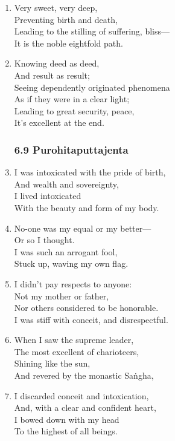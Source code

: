\documentclass[10pt, openany]{book}
\begin{document}
\begin{enumerate}
\item Very sweet, very deep,\\
Preventing birth and death,\\
Leading to the stilling of suffering, bliss—\\
It is the noble eightfold path.

\item Knowing deed as deed,\\
And result as result;\\
Seeing dependently originated phenomena\\
As if they were in a clear light;\\
Leading to great security, peace,\\
It’s excellent at the end.

\subsubsection*{6.9 Purohitaputtajenta}

\item I was intoxicated with the pride of birth,\\
And wealth and sovereignty,\\
I lived intoxicated\\
With the beauty and form of my body.

\item No-one was my equal or my better—\\
Or so I thought.\\
I was such an arrogant fool,\\
Stuck up, waving my own flag.

\item I didn’t pay respects to anyone:\\
Not my mother or father,\\
Nor others considered to be honorable.\\
I was stiff with conceit, and disrespectful.

\item When I saw the supreme leader,\\
The most excellent of charioteers,\\
Shining like the sun,\\
And revered by the monastic Saṅgha,

\item I discarded conceit and intoxication,\\
And, with a clear and confident heart,\\
I bowed down with my head\\
To the highest of all beings.


\end{enumerate}
\end{document}
